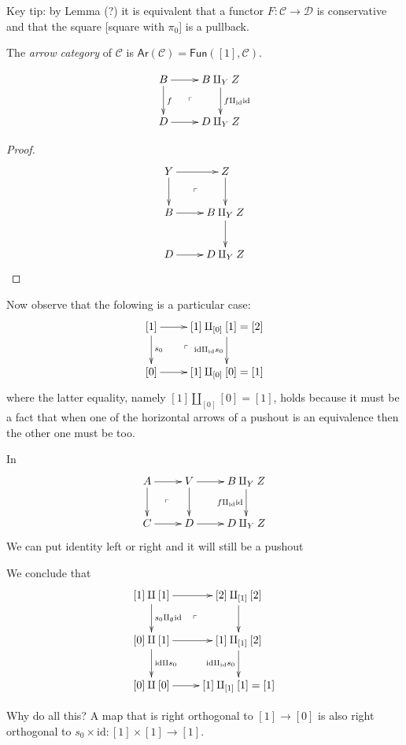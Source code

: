 Key tip: by Lemma (?) it is equivalent that
a functor $F: \mathcal{C} \to \mathcal{D}$ is conservative and
that the square [square with $\pi_0$] is a pullback.

\begin{definition}
\label{definition-arrow-category}
The {\it arrow category} of $\mathcal{C}$ is
$\mathsf{Ar}(\mathcal{C})=\mathsf{Fun}([1],\mathcal{C})$.
\end{definition}

\begin{lemma}
\label{lemma-1}
$$
\xymatrix{
B\ar[r]\ar[d]^f\ar@{}[dr]|-{\ulcorner}&B \amalg_YZ\ar[d]^
{f\amalg_{\text{id}}\text{id}}\\
D\ar[r]&D \amalg_YZ
}
$$
\end{lemma}

\begin{proof}
$$
\xymatrix{
Y\ar[r]\ar[d]\ar@{}[dr]|-{\ulcorner}&Z\ar[d]\\
B\ar[r]&B\amalg_YZ\ar[d]\\
D\ar[r]&D\amalg_YZ
}
$$
\end{proof}

Now observe that the folowing
is a particular case:
$$
\xymatrix{
[1]\ar[r]\ar[d]^{s_0}\ar@{}[dr]|-{\ulcorner}&[1]\amalg_{[0]}[1]=[2]\ar[d]
_{\text{id}\amalg_{\text{id}}s_0}\\
[0]\ar[r]&[1]\amalg_{[0]}[0]=[1]
}
$$
where the latter equality,
namely $[1]\amalg_{[0]}[0]=[1]$,
holds because it must be a fact that
when one of the horizontal arrows of a pushout 
is an equivalence then the other one must be too.

\begin{lemma}
\label{lemma-2}
In
$$
\xymatrix{
A\ar[r]\ar[d]\ar@{}[dr]|-{\ulcorner}&V\ar[d]
\ar[r]& B\amalg_YZ\ar[d]_{f\amalg_{\text{id}}\text{id}}\\
C\ar[r]&D\ar[r]&D\amalg_YZ
}
$$
We can put identity left or right and it will still be a pushout
\end{lemma}

We conclude that
$$
\xymatrix{
[1]\amalg [1]\ar[r]\ar[d]^{s_0 \amalg_{\emptyset}\text{id}}
\ar@{}[dr]|-{\ulcorner}&[2]\amalg_{[1]}[2]\ar[d]\\
[0]\amalg[1]\ar[d]^{\text{id}\amalg s_0}\ar[r]&[1]\amalg_{[1]}[2]
\ar[d]_{\text{id} \amalg_{\text{id}}s_0}\\
[0]\amalg[0]\ar[r]&[1]\amalg_{[1]}[1]=[1]
}
$$

Why do all this? A map that is right orthogonal
to $[1]\to[0]$ is also right orthogonal
to $s_0\times \text{id}:[1]\times[1]\to[1]$.

